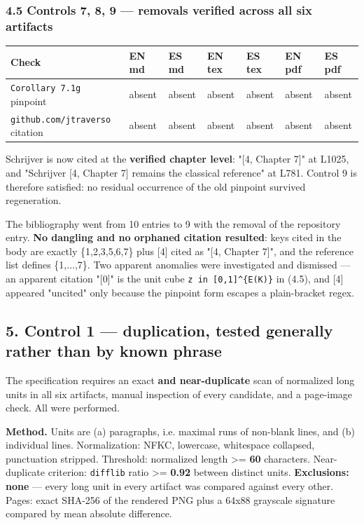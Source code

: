 \documentclass[
  9pt,
  a4paper,
]{article}
\newcounter{none} %
\begin{document}
\subsubsection{4.5 Controls 7, 8, 9 --- removals verified across all six
artifacts}\label{45-controls-7-8-9--removals-verified-across-all-six-artifacts}

{\def\LTcaptype{none} %
\begin{longtable}[]{@{}lllllll@{}}
\toprule\noalign{}
Check & EN md & ES md & EN tex & ES tex & EN pdf & ES pdf \\
\midrule\noalign{}
\endhead
\bottomrule\noalign{}
\endlastfoot
\texttt{Corollary\ 7.1g} pinpoint & absent & absent & absent & absent &
absent & absent \\
\texttt{github.com/jtraverso} citation & absent & absent & absent &
absent & absent & absent \\
\end{longtable}
}

Schrijver is now cited at the \textbf{verified chapter level}: "{[}4,
Chapter 7{]}" at L1025, and "Schrijver {[}4, Chapter 7{]} remains the
classical reference" at L781. Control 9 is therefore satisfied: no
residual occurrence of the old pinpoint survived regeneration.

The bibliography went from 10 entries to 9 with the removal of the
repository entry. \textbf{No dangling and no orphaned citation
resulted}: keys cited in the body are exactly \{1,2,3,5,6,7\} plus
{[}4{]} cited as "{[}4, Chapter 7{]}", and the reference list defines
\{1,...,7\}. Two apparent anomalies were investigated and dismissed ---
an apparent citation "{[}0{]}" is the unit cube
\texttt{z\ in\ {[}0,1{]}\^{}\{E(K)\}} in (4.5), and {[}4{]} appeared
"uncited" only because the pinpoint form escapes a plain-bracket regex.

\subsection{5. Control 1 --- duplication, tested generally rather than
by known
phrase}\label{5-control-1--duplication-tested-generally-rather-than-by-known-phrase}

The specification requires an exact \textbf{and near-duplicate} scan of
normalized long units in all six artifacts, manual inspection of every
candidate, and a page-image check. All were performed.

\textbf{Method.} Units are (a) paragraphs, i.e. maximal runs of
non-blank lines, and (b) individual lines. Normalization: NFKC,
lowercase, whitespace collapsed, punctuation stripped. Threshold:
normalized length \textgreater= \textbf{60} characters. Near-duplicate
criterion: \texttt{difflib} ratio \textgreater= \textbf{0.92} between
distinct units. \textbf{Exclusions: none} --- every long unit in every
artifact was compared against every other. Pages: exact SHA-256 of the
rendered PNG plus a 64x88 grayscale signature compared by mean absolute
difference.
\end{document}
